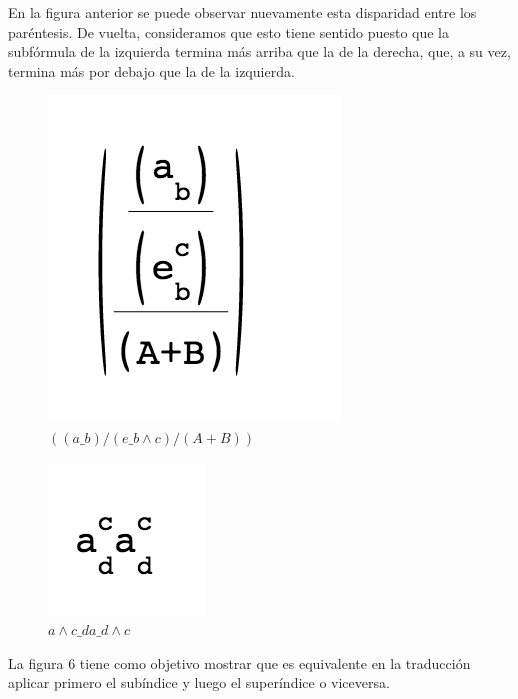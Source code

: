 \indent En la figura anterior se puede observar nuevamente esta disparidad entre los paréntesis. De vuelta, consideramos que esto tiene sentido puesto que la subfórmula de la izquierda termina más arriba que la de la derecha, que, a su vez, termina más por debajo que la de la izquierda.\\

\begin{figure}[H]
      \begin{centering}
        \includegraphics{imgs/e}
        \caption{$((a\_b)/(e\_b\wedge c)/(A + B))$}
       \end{centering}
\end{figure}
\begin{figure}[H]
      \begin{centering}
        \includegraphics{imgs/f}
        \caption{${a\wedge c\_d}{a\_d\wedge c}$}
       \end{centering}   
\end{figure}

\indent La figura 6 tiene como objetivo mostrar que es equivalente en la traducción aplicar primero el subíndice y luego el superíndice o viceversa.\\


